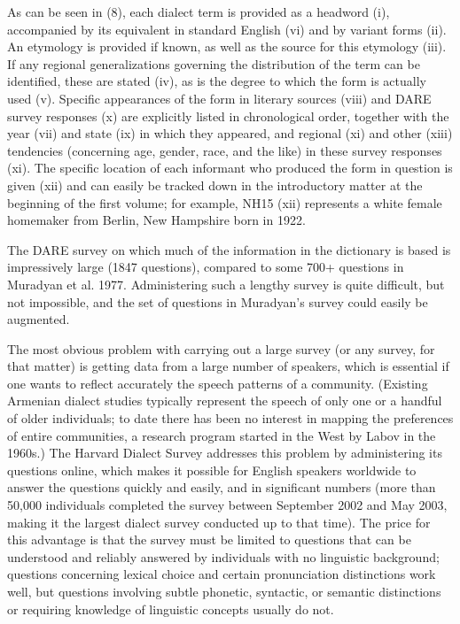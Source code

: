 As can be seen in (8), each dialect term is provided as a headword (i), accompanied by its equivalent in standard English (vi) and by variant forms (ii). An etymology is provided if known, as well as the source for this etymology (iii). If any regional generalizations governing the distribution of the term can be identified, these are stated (iv), as is the degree to which the form is actually used (v). Specific appearances of the form in literary sources (viii) and DARE survey responses (x) are explicitly listed in chronological order, together with the year (vii) and state (ix) in which they appeared, and regional (xi) and other (xiii) tendencies (concerning age, gender, race, and the like) in these survey responses (xi). The specific location of each informant who produced the form in question is given (xii) and can easily be tracked down in the introductory matter at the beginning of the first volume; for example, NH15 (xii) represents a white female homemaker from Berlin, New Hampshire born in 1922.

The DARE survey on which much of the information in the dictionary is based is impressively large (1847 questions), compared to some 700+ questions in Muradyan et al. 1977. Administering such a lengthy survey is quite difficult, but not impossible, and the set of questions in Muradyan’s survey could easily be augmented.

The most obvious problem with carrying out a large survey (or any survey, for that matter) is getting data from a large number of speakers, which is essential if one wants to reflect accurately the speech patterns of a community. (Existing Armenian dialect studies typically represent the speech of only one or a handful of older individuals; to date there has been no interest in mapping the preferences of entire communities, a research program started in the West by Labov in the 1960s.) The Harvard Dialect Survey addresses this problem by administering its questions online, which makes it possible for English speakers worldwide to answer the questions quickly and easily, and in significant numbers (more than 50,000 individuals completed the survey between September 2002 and May 2003, making it the largest dialect survey conducted up to that time). The price for this advantage is that the survey must be limited to questions that can be understood and reliably answered by individuals with no linguistic background; questions concerning lexical choice and certain pronunciation distinctions work well, but questions involving subtle phonetic, syntactic, or semantic distinctions or requiring knowledge of linguistic concepts usually do not.

